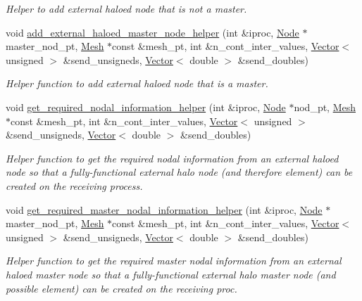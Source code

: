 \begin{DoxyCompactItemize}
\begin{DoxyCompactList}\small\item\em Helper to add external haloed node that is not a master. \end{DoxyCompactList}\item 
void \hyperlink{namespaceoomph_1_1Missing__masters__functions_acd3ecd40c8ebcfdb04f2e26c3fc304cc}{add\+\_\+external\+\_\+haloed\+\_\+master\+\_\+node\+\_\+helper} (int \&iproc, \hyperlink{classoomph_1_1Node}{Node} $\ast$master\+\_\+nod\+\_\+pt, \hyperlink{classoomph_1_1Mesh}{Mesh} $\ast$const \&mesh\+\_\+pt, int \&n\+\_\+cont\+\_\+inter\+\_\+values, \hyperlink{classoomph_1_1Vector}{Vector}$<$ unsigned $>$ \&send\+\_\+unsigneds, \hyperlink{classoomph_1_1Vector}{Vector}$<$ double $>$ \&send\+\_\+doubles)
\begin{DoxyCompactList}\small\item\em Helper function to add external haloed node that is a master. \end{DoxyCompactList}\item 
void \hyperlink{namespaceoomph_1_1Missing__masters__functions_acc3c8930de1090a3dd7d4a3ddb55cacb}{get\+\_\+required\+\_\+nodal\+\_\+information\+\_\+helper} (int \&iproc, \hyperlink{classoomph_1_1Node}{Node} $\ast$nod\+\_\+pt, \hyperlink{classoomph_1_1Mesh}{Mesh} $\ast$const \&mesh\+\_\+pt, int \&n\+\_\+cont\+\_\+inter\+\_\+values, \hyperlink{classoomph_1_1Vector}{Vector}$<$ unsigned $>$ \&send\+\_\+unsigneds, \hyperlink{classoomph_1_1Vector}{Vector}$<$ double $>$ \&send\+\_\+doubles)
\begin{DoxyCompactList}\small\item\em Helper function to get the required nodal information from an external haloed node so that a fully-\/functional external halo node (and therefore element) can be created on the receiving process. \end{DoxyCompactList}\item 
void \hyperlink{namespaceoomph_1_1Missing__masters__functions_a56eaf8c8da98960d9929a0c9921c4df7}{get\+\_\+required\+\_\+master\+\_\+nodal\+\_\+information\+\_\+helper} (int \&iproc, \hyperlink{classoomph_1_1Node}{Node} $\ast$master\+\_\+nod\+\_\+pt, \hyperlink{classoomph_1_1Mesh}{Mesh} $\ast$const \&mesh\+\_\+pt, int \&n\+\_\+cont\+\_\+inter\+\_\+values, \hyperlink{classoomph_1_1Vector}{Vector}$<$ unsigned $>$ \&send\+\_\+unsigneds, \hyperlink{classoomph_1_1Vector}{Vector}$<$ double $>$ \&send\+\_\+doubles)
\begin{DoxyCompactList}\small\item\em Helper function to get the required master nodal information from an external haloed master node so that a fully-\/functional external halo master node (and possible element) can be created on the receiving proc. \end{DoxyCompactList}\item 

\end{DoxyCompactItemize}
